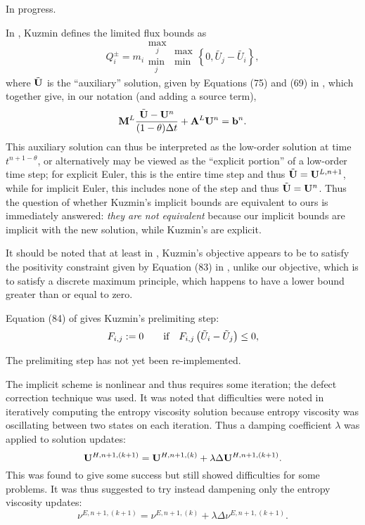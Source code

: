 \begin{enumerate}
In progress.

In \cite{kuzmin_FCT}, Kuzmin defines the limited flux bounds as
\[
  Q_i^\pm=m_i\substack{\max_j\\\min_j}\substack{\max\\\min}
    \left\{0,\tilde{U_j}-\tilde{U_i}\right\},
\]
where $\tilde{\mathbf{U}}$ is the ``auxiliary'' solution, given by Equations (75) and (69)
in \cite{kuzmin_FCT}, which together give, in our notation (and adding a source term),
\[
  \mathbf{M}^L\frac{\tilde{\mathbf{U}}-\mathbf{U}^n}{(1-\theta)\Delta t} + \mathbf{A}^L\mathbf{U}^n = \mathbf{b}^n.
\]
This auxiliary solution can thus be interpreted as the low-order solution at time
$t^{n+1-\theta}$, or alternatively may be viewed as the ``explicit portion'' of
a low-order time step; for explicit Euler, this is the entire time step and thus
$\tilde{\mathbf{U}}=\mathbf{U}^{L,n+1}$, while for implicit Euler, this includes none of the step
and thus $\tilde{\mathbf{U}}=\mathbf{U}^{n}$. Thus the question of whether Kuzmin's implicit bounds are
equivalent to ours is immediately answered: \emph{they are not equivalent} because
our implicit bounds are implicit with the new solution, while Kuzmin's are
explicit.

It should be noted that at least in \cite{kuzmin_FCT}, Kuzmin's objective
appears to be to satisfy the positivity constraint given by Equation (83)
in \cite{kuzmin_FCT}, unlike our objective, which is to satisfy a discrete
maximum principle, which happens to have a lower bound greater than or
equal to zero.

Equation (84) of \cite{kuzmin_FCT} gives Kuzmin's prelimiting step:
\[
  F_{i,j} := 0 \qquad \mbox{if}\quad F_{i,j} \left(\tilde{U}_i-\tilde{U}_j\right)\leq 0,
\]

The prelimiting step has not yet been re-implemented.

The implicit scheme is nonlinear and thus requires some iteration; the defect
correction technique was used. It was noted that difficulties were noted in
iteratively computing the entropy viscosity solution because entropy viscosity
was oscillating between two states on each iteration. Thus a damping coefficient
$\lambda$ was applied to solution updates:
\[
  \mathbf{U}^{H,n+1,(k+1)} = \mathbf{U}^{H,n+1,(k)} + \lambda\Delta\mathbf{U}^{H,n+1,(k+1)}.
\]
This was found to give some success but still showed difficulties for some
problems. It was thus suggested to try instead dampening only the entropy viscosity updates:
\[
  \nu^{E,n+1,(k+1)} = \nu^{E,n+1,(k)} + \lambda\Delta\nu^{E,n+1,(k+1)}.
\]
\end{enumerate}
